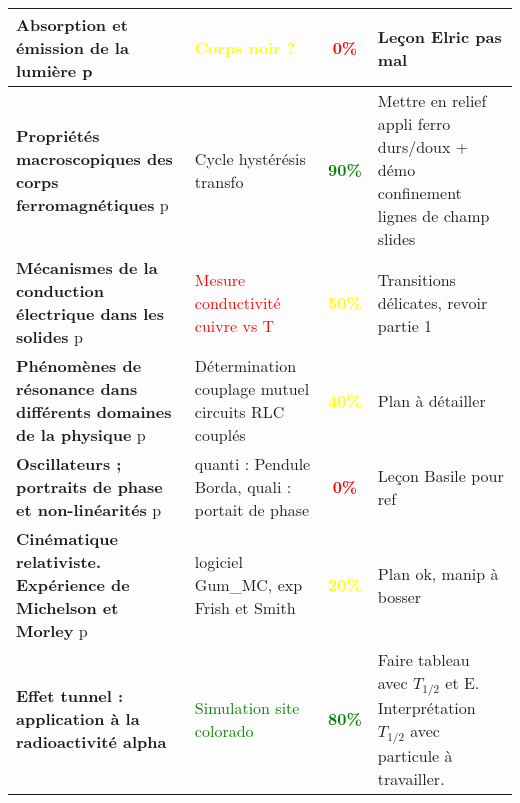 \begin{changemargin}{-1.5cm}{-0cm}
\begin{center}
\begin{tabularx}{\paperwidth-2cm}{| X | X | c | X |}
  \hline
  \textbf{Absorption et émission de la lumière} p\pageref{LP_Absorption} & \textcolor{yellow}{Corps noir ?} & \textcolor{red}{\textbf{0\%}} & Leçon Elric pas mal \\
  \hline
  \hline
  \textbf{Propriétés macroscopiques des corps ferromagnétiques } p\pageref{LP_Ferromagnetisme} & Cycle hystérésis transfo & \textcolor{green}{\textbf{90\%}} & Mettre en relief appli ferro durs/doux + démo confinement lignes de champ slides \\
  \hline
  \textbf{Mécanismes de la conduction électrique dans les solides} p\pageref{LP_Conduction} & \textcolor{red}{Mesure conductivité cuivre vs T} & \textcolor{yellow}{\textbf{50\%}} & Transitions délicates, revoir partie 1 \\
  \hline
  \textbf{Phénomènes de résonance dans différents domaines de la physique} p\pageref{LP_resonance} & Détermination couplage mutuel circuits RLC couplés & \textcolor{yellow}{\textbf{40\%}} & Plan à détailler  \\
  \hline
  \textbf{Oscillateurs ; portraits de phase et non-linéarités} p\pageref{LP_PortaitPhase}~& quanti : Pendule Borda, quali : portait de phase & \textcolor{red}{\textbf{0\%}} & Leçon Basile pour ref  \\
  \hline
  \hline
  \textbf{Cinématique relativiste. Expérience de Michelson et Morley} p\pageref{LP_CinematiqueRelativiste} & logiciel Gum\_MC, exp Frish et Smith & \textcolor{yellow}{\textbf{20\%}} & Plan ok, manip à bosser  \\
  \hline
  \textbf{Effet tunnel : application à la radioactivité alpha} & \textcolor{green}{Simulation site colorado}& \textcolor{green}{\textbf{80\%}} & Faire tableau avec $T_{1/2}$ et E. Interprétation $T_{1/2}$ avec particule à travailler. \\
  \hline
\end{tabularx}
\end{center}

\end{changemargin}